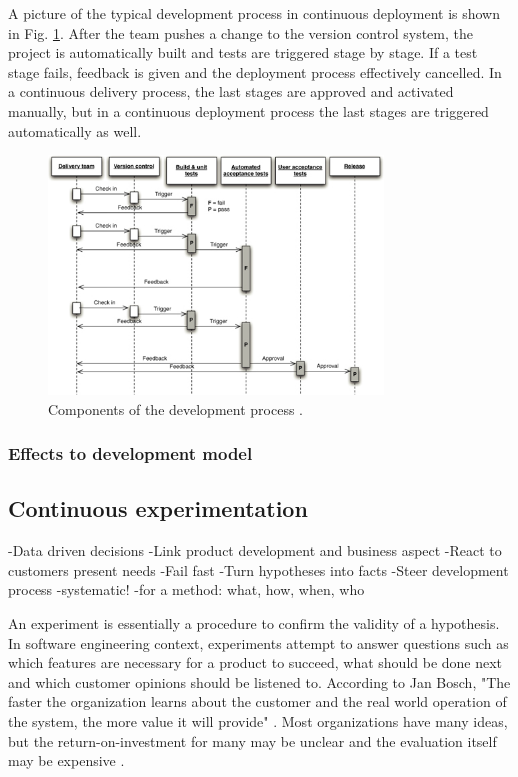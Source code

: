 \documentclass[english]{tktltiki2}
\theoremstyle{definition}
\theoremstyle{remark}
\begin{document}
A picture of the typical development process in continuous deployment is shown in Fig. \ref{fig3}. After the team pushes a change to the version control system, the project is automatically built and tests are triggered stage by stage. If a test stage fails, feedback is given and the deployment process effectively cancelled. In a continuous delivery process, the last stages are approved and activated manually, but in a continuous deployment process the last stages are triggered automatically as well.

\begin{figure}[!t]
	\centering
	\includegraphics[width=3.5in]{developmentprocess.jpg}
	\caption{Components of the development process \cite{cdbook}.}
	\label{fig3}
\end{figure}

\subsubsection{Effects to development model}

\subsection{Continuous experimentation}

-Data driven decisions
-Link product development and business aspect
-React to customers present needs
-Fail fast
-Turn hypotheses into facts
-Steer development process
-systematic!
-for a method: what, how, when, who

An experiment is essentially a procedure to confirm the validity of a hypothesis. In software engineering context, experiments attempt to answer questions such as which features are necessary for a product to succeed, what should be done next and which customer opinions should be listened to. According to Jan Bosch, "The faster the organization learns about the customer and the real world operation of the system, the more value it will provide" \cite{bosch2012building}. Most organizations have many ideas, but the return-on-investment for many may be unclear and the evaluation itself may be expensive \cite{kohavi2007practical}. 
\end{document}
